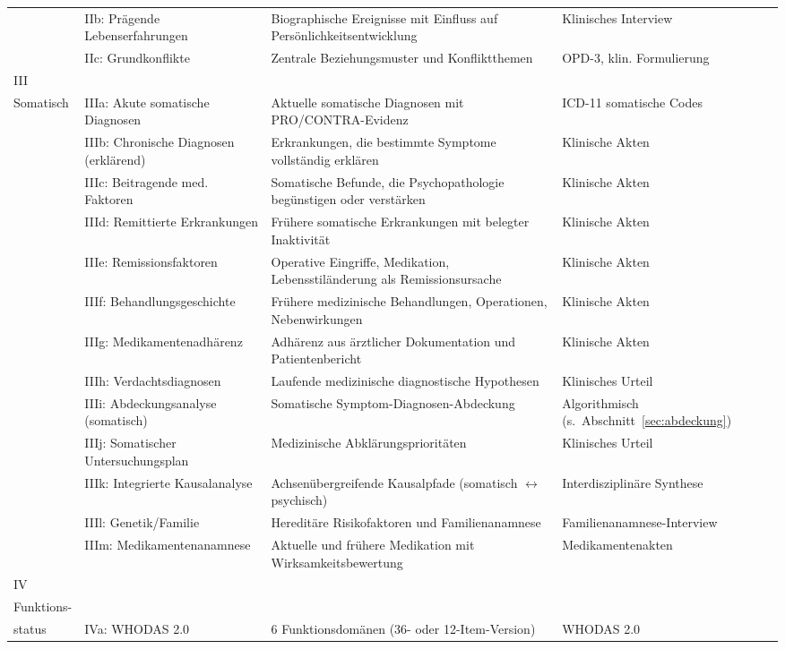 \documentclass[11pt,a4paper]{article}
\begin{document}
\begin{longtable}{@{}L{1.8cm}L{2.4cm}L{5.0cm}L{4.0cm}@{}}
 & IIb: Pr\"agende Lebenserfahrungen & Biographische Ereignisse mit Einfluss auf Pers\"onlichkeitsentwicklung & Klinisches Interview \\
 & IIc: Grundkonflikte & Zentrale Beziehungsmuster und Konfliktthemen & OPD-3, klin. Formulierung \\
\midrule
III\\Somatisch & IIIa: Akute somatische Diagnosen & Aktuelle somatische Diagnosen mit PRO/CONTRA-Evidenz & ICD-11 somatische Codes \\
 & IIIb: Chronische Diagnosen (erkl\"arend) & Erkrankungen, die bestimmte Symptome vollst\"andig erkl\"aren & Klinische Akten \\
 & IIIc: Beitragende med. Faktoren & Somatische Befunde, die Psychopathologie beg\"unstigen oder verst\"arken & Klinische Akten \\
 & IIId: Remittierte Erkrankungen & Fr\"uhere somatische Erkrankungen mit belegter Inaktivit\"at & Klinische Akten \\
 & IIIe: Remissionsfaktoren & Operative Eingriffe, Medikation, Lebensstil\"anderung als Remissionsursache & Klinische Akten \\
 & IIIf: Behandlungsgeschichte & Fr\"uhere medizinische Behandlungen, Operationen, Nebenwirkungen & Klinische Akten \\
 & IIIg: Medikamentenadh\"arenz & Adh\"arenz aus \"arztlicher Dokumentation und Patientenbericht & Klinische Akten \\
 & IIIh: Verdachtsdiagnosen & Laufende medizinische diagnostische Hypothesen & Klinisches Urteil \\
 & IIIi: Abdeckungsanalyse (somatisch) & Somatische Symptom-Diagnosen-Abdeckung & Algorithmisch (s.\ Abschnitt~\ref{sec:abdeckung}) \\
 & IIIj: Somatischer Untersuchungsplan & Medizinische Abkl\"arungspriorit\"aten & Klinisches Urteil \\
 & IIIk: Integrierte Kausalanalyse & Achsen\"ubergreifende Kausalpfade (somatisch $\leftrightarrow$ psychisch) & Interdisziplin\"are Synthese \\
 & IIIl: Genetik/Familie & Heredit\"are Risikofaktoren und Familienanamnese & Familien\-anamnese-Interview \\
 & IIIm: Medikamentenanamnese & Aktuelle und fr\"uhere Medikation mit Wirksamkeitsbewertung & Medikamentenakten \\
\midrule
IV\\Funktions-\\status & IVa: WHODAS 2.0 & 6 Funktionsdom\"anen (36- oder 12-Item-Version) & WHODAS 2.0 \\

\end{longtable}
\end{document}
